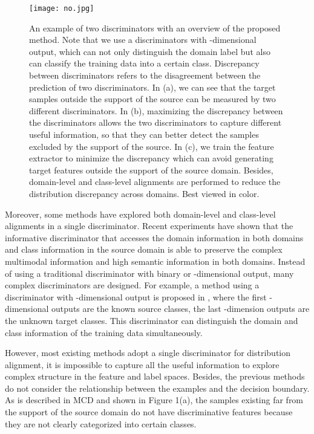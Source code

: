 \documentclass{ecai}
\begin{document}
\begin{figure*}[htbp]
\begin{center}
\texttt{[image: no.jpg]}
\end{center}
\caption{An example of two discriminators with an overview of the proposed method. Note that we use a discriminators with -dimensional output, which can not only distinguish the domain label but also can classify the training data into a certain class. Discrepancy between discriminators refers to the disagreement between the prediction of two discriminators. In (a), we can see that the target samples outside the support of the source can be measured by two different discriminators. In (b), maximizing the discrepancy between the discriminators allows the two discriminators to capture different useful information, so that they can better detect the samples excluded by the support of the source. In (c), we train the feature extractor to minimize the discrepancy which can avoid generating target features outside the support of the source domain. Besides, domain-level and class-level alignments are performed to reduce the distribution discrepancy across domains. Best viewed in color.}
\label{overall}
\end{figure*}



Moreover, some methods have explored both domain-level and class-level alignments in a single discriminator. Recent experiments have shown that the informative discriminator that accesses the domain information in both domains and class information in the source domain is able to preserve the complex multimodal information and high semantic information in both domains\cite{b14,b15,b16,b17}. Instead of using a traditional discriminator with binary or -dimensional output, many complex discriminators are designed. For example, a method using a discriminator with -dimensional output is proposed in \cite{b17}, where the first -dimensional outputs are the known source classes, the last -dimension outputs are the unknown target classes. This discriminator can distinguish the domain and class information of the training data simultaneously.

However, most existing methods adopt a single discriminator for distribution alignment, it is impossible to capture all the useful information to explore complex structure in the feature and label spaces. Besides, the previous methods do not consider the relationship between the examples and the decision boundary.  As is described in MCD\cite{b24} and shown in Figure 1(a), the samples existing far from the support of the source domain do not have discriminative features because they are not clearly categorized into certain classes.
\end{document}
